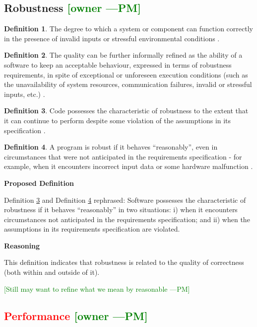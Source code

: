 \documentclass[letterpaper,cleveref]{lipics-v2019}
\newcommand{\authornote}[3]{\textcolor{#1}{[#3 ---#2]}}
\newcommand{\authornote}[3]{}
\newcommand{\pmi}[1]{\authornote{green}{PM}{#1}} %
\newcommand{\notdone}[1]{\textcolor{red}{#1}}
\theoremstyle{definition}
\newtheorem{defn}{Definition}
\begin{document}
\subsection{{Robustness} \pmi{owner}}
\begin{defn}
	The degree to which a system or component can function correctly in the
	presence of invalid inputs or stressful environmental conditions
	\citep{IEEEStdGlossarySET1990}.
\end{defn}
\begin{defn}
	The quality can be further informally refined as the ability of a software to
	keep an acceptable behaviour, expressed in terms of robustness requirements,
	in
	spite of exceptional or unforeseen execution conditions (such as the
	unavailability of system resources, communication failures, invalid or
	stressful inputs, etc.) \citep{fernandez2005model}.
\end{defn}
\begin{defn} \label{RobustnessPartialDefn}
	Code possesses the characteristic of robustness to the extent that it can
	continue to perform despite some violation of the assumptions in its
	specification \citep{boehm2007software}.
\end{defn}
\begin{defn} \label{RobustnessDefnSelected}
	A program is robust if it behaves ``reasonably'', even in circumstances that
	were not anticipated in the requirements specification - for example, when it
	encounters incorrect input data or some hardware malfunction
	\citep{ghezzi1991fundamentals}.
\end{defn}

\noindent \textbf{Proposed Definition}

Definition \ref{RobustnessPartialDefn} and Definition
\ref{RobustnessDefnSelected} rephrased: Software possesses the
characteristic of robustness if it behaves ``reasonably'' in two situations: i)
when it encounters circumstances not anticipated in the requirements
specification; and ii) when the assumptions in its requirements specification
are violated.

\noindent \textbf{Reasoning}

This definition indicates that robustness is related to the quality of
correctness (both within and outside of it). 

\pmi{Still may want to refine what we mean by reasonable}

\subsection{\notdone{Performance} \pmi{owner}}
\end{document}
